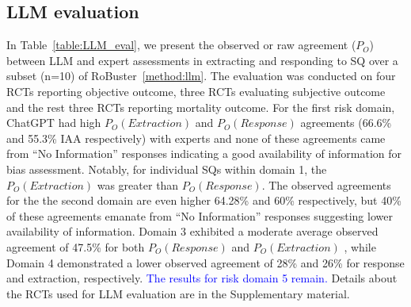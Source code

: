 \documentclass[sn-mathphys,Numbered]{sn-jnl}%
\theoremstyle{thmstyleone}%
\theoremstyle{thmstyletwo}%
\theoremstyle{thmstylethree}%
\begin{document}
%
%
%
\subsection{LLM evaluation}
%
In Table~\ref{table:LLM_eval}, we present the observed or raw agreement ($P_{O}$) between LLM and expert assessments in extracting and responding to SQ over a subset (n=10) of RoBuster~\ref{method:llm}. 
The evaluation was conducted on four RCTs reporting objective outcome, three RCTs evaluating subjective outcome and the rest three RCTs reporting mortality outcome.
For the first risk domain, ChatGPT had high $P_{O} (Extraction)$ and $P_{O} (Response)$ agreements (66.6\% and 55.3\% IAA respectively) with experts and none of these agreements came from ``No Information'' responses indicating a good availability of information for bias assessment. 
Notably, for individual SQs within domain 1, the $P_{O} (Extraction)$ was greater than $P_{O} (Response)$.
The observed agreements for the the second domain are even higher 64.28\% and 60\% respectively, but 40\% of these agreements emanate from ``No Information'' responses suggesting lower availability of information. 
Domain 3 exhibited a moderate average observed agreement of 47.5\% for both $P_{O} (Response)$ and $P_{O} (Extraction)$ , while Domain 4 demonstrated a lower observed agreement of 28\% and 26\% for response and extraction, respectively.
\textcolor{blue}{The results for risk domain 5 remain.}
Details about the RCTs used for LLM evaluation are in the Supplementary material.
%
%
%
\end{document}
